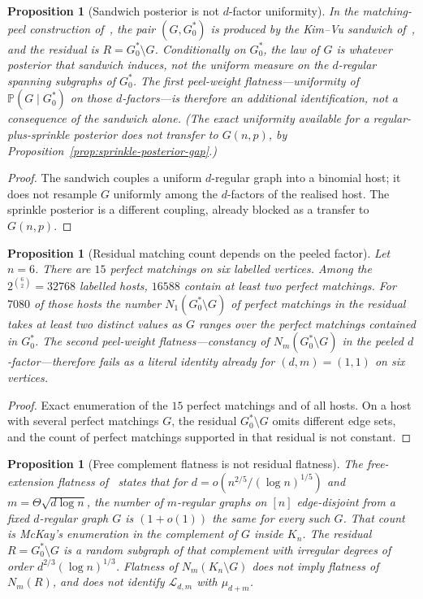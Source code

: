 \documentclass[11pt]{article}
\newtheorem{proposition}[theorem]{Proposition}
\newcommand{\PP}{\mathbb{P}}
\begin{document}
\begin{proposition}[Sandwich posterior is not \(d\)-factor uniformity]
\label{prop:peel-first-not-free}
In the matching-peel construction of~\cite{PlusOneV1}, the pair
\((G,G^*_0)\) is produced by the Kim--Vu sandwich of~\cite{BIM25}, and the
residual is \(R=G^*_0\setminus G\).
Conditionally on \(G^*_0\), the law of \(G\) is whatever posterior that sandwich
induces, not the uniform measure on the \(d\)-regular spanning subgraphs of
\(G^*_0\).
The first peel-weight flatness---uniformity of \(\PP(G\mid G^*_0)\) on those
\(d\)-factors---is therefore an additional identification, not a consequence of
the sandwich alone.
(The exact uniformity available for a regular-plus-sprinkle posterior does not
transfer to \(G(n,p)\), by Proposition~\ref{prop:sprinkle-posterior-gap}.)
\end{proposition}

\begin{proof}
The sandwich couples a uniform \(d\)-regular graph into a binomial host; it does
not resample \(G\) uniformly among the \(d\)-factors of the realised host.
The sprinkle posterior is a different coupling, already blocked as a transfer
to \(G(n,p)\).
\end{proof}

\begin{proposition}[Residual matching count depends on the peeled factor]
\label{prop:nm-not-flat}
Let \(n=6\). There are \(15\) perfect matchings on six labelled vertices.
Among the \(2^{\binom{6}{2}}=32768\) labelled hosts, \(16588\) contain at least two
perfect matchings.
For \(7080\) of those hosts the number \(N_1(G^*_0\setminus G)\) of perfect
matchings in the residual takes at least two distinct values as \(G\) ranges over
the perfect matchings contained in \(G^*_0\).
The second peel-weight flatness---constancy of \(N_m(G^*_0\setminus G)\) in the
peeled \(d\)-factor---therefore fails as a literal identity already for
\((d,m)=(1,1)\) on six vertices.
\end{proposition}

\begin{proof}
Exact enumeration of the \(15\) perfect matchings and of all hosts.
On a host with several perfect matchings \(G\), the residual
\(G^*_0\setminus G\) omits different edge sets, and the count of perfect
matchings supported in that residual is not constant.
\end{proof}

\begin{proposition}[Free complement flatness is not residual flatness]
\label{prop:free-not-residual}
The free-extension flatness of~\cite{PlusOneV1} states that for
\(d=o(n^{2/5}/(\log n)^{1/5})\) and \(m=\Theta\sqrt{d\log n}\), the number of
\(m\)-regular graphs on \([n]\) edge-disjoint from a fixed \(d\)-regular graph
\(G\) is \((1+o(1))\) the same for every such \(G\).
That count is McKay's enumeration in the complement of \(G\) inside \(K_n\).
The residual \(R=G^*_0\setminus G\) is a random subgraph of that complement
with irregular degrees of order \(d^{2/3}(\log n)^{1/3}\).
Flatness of \(N_m(K_n\setminus G)\) does not imply flatness of \(N_m(R)\), and
does not identify \(\mathcal{L}_{d,m}\) with \(\mu_{d+m}\).
\end{proposition}
\end{document}
